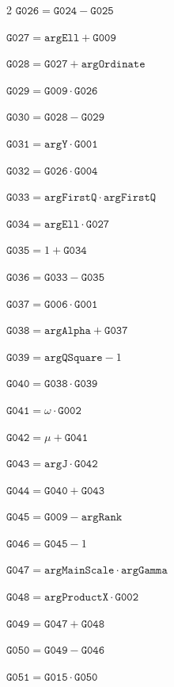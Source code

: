 \documentclass[10pt]{article}
\begin{document}
\begin{multicols}{2}
\noindent $\mathtt{G026}=\mathtt{G024}-\mathtt{G025}$\par
\noindent $\mathtt{G027}=\mathtt{argEll}+\mathtt{G009}$\par
\noindent $\mathtt{G028}=\mathtt{G027}+\mathtt{argOrdinate}$\par
\noindent $\mathtt{G029}=\mathtt{G009}\cdot \mathtt{G026}$\par
\noindent $\mathtt{G030}=\mathtt{G028}-\mathtt{G029}$\par
\noindent $\mathtt{G031}=\mathtt{argY}\cdot \mathtt{G001}$\par
\noindent $\mathtt{G032}=\mathtt{G026}\cdot \mathtt{G004}$\par
\noindent $\mathtt{G033}=\mathtt{argFirstQ}\cdot \mathtt{argFirstQ}$\par
\noindent $\mathtt{G034}=\mathtt{argEll}\cdot \mathtt{G027}$\par
\noindent $\mathtt{G035}=1+\mathtt{G034}$\par
\noindent $\mathtt{G036}=\mathtt{G033}-\mathtt{G035}$\par
\noindent $\mathtt{G037}=\mathtt{G006}\cdot \mathtt{G001}$\par
\noindent $\mathtt{G038}=\mathtt{argAlpha}+\mathtt{G037}$\par
\noindent $\mathtt{G039}=\mathtt{argQSquare}-1$\par
\noindent $\mathtt{G040}=\mathtt{G038}\cdot \mathtt{G039}$\par
\noindent $\mathtt{G041}=\omega\cdot \mathtt{G002}$\par
\noindent $\mathtt{G042}=\mu+\mathtt{G041}$\par
\noindent $\mathtt{G043}=\mathtt{argJ}\cdot \mathtt{G042}$\par
\noindent $\mathtt{G044}=\mathtt{G040}+\mathtt{G043}$\par
\noindent $\mathtt{G045}=\mathtt{G009}-\mathtt{argRank}$\par
\noindent $\mathtt{G046}=\mathtt{G045}-1$\par
\noindent $\mathtt{G047}=\mathtt{argMainScale}\cdot \mathtt{argGamma}$\par
\noindent $\mathtt{G048}=\mathtt{argProductX}\cdot \mathtt{G002}$\par
\noindent $\mathtt{G049}=\mathtt{G047}+\mathtt{G048}$\par
\noindent $\mathtt{G050}=\mathtt{G049}-\mathtt{G046}$\par
\noindent $\mathtt{G051}=\mathtt{G015}\cdot \mathtt{G050}$\par

\end{multicols}
\end{document}
